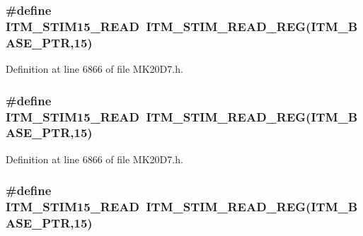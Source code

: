 \subsubsection[{\texorpdfstring{I\+T\+M\+\_\+\+S\+T\+I\+M15\+\_\+\+R\+E\+AD}{ITM_STIM15_READ}}]{\setlength{\rightskip}{0pt plus 5cm}\#define I\+T\+M\+\_\+\+S\+T\+I\+M15\+\_\+\+R\+E\+AD~{\bf I\+T\+M\+\_\+\+S\+T\+I\+M\+\_\+\+R\+E\+A\+D\+\_\+\+R\+EG}({\bf I\+T\+M\+\_\+\+B\+A\+S\+E\+\_\+\+P\+TR},15)}\hypertarget{group___i_t_m___register___accessor___macros_ga3ea562a68b32ba37c430e0b6d2507075}{}\label{group___i_t_m___register___accessor___macros_ga3ea562a68b32ba37c430e0b6d2507075}


Definition at line 6866 of file M\+K20\+D7.\+h.

\subsubsection[{\texorpdfstring{I\+T\+M\+\_\+\+S\+T\+I\+M15\+\_\+\+R\+E\+AD}{ITM_STIM15_READ}}]{\setlength{\rightskip}{0pt plus 5cm}\#define I\+T\+M\+\_\+\+S\+T\+I\+M15\+\_\+\+R\+E\+AD~{\bf I\+T\+M\+\_\+\+S\+T\+I\+M\+\_\+\+R\+E\+A\+D\+\_\+\+R\+EG}({\bf I\+T\+M\+\_\+\+B\+A\+S\+E\+\_\+\+P\+TR},15)}\hypertarget{group___i_t_m___register___accessor___macros_ga3ea562a68b32ba37c430e0b6d2507075}{}\label{group___i_t_m___register___accessor___macros_ga3ea562a68b32ba37c430e0b6d2507075}


Definition at line 6866 of file M\+K20\+D7.\+h.

\subsubsection[{\texorpdfstring{I\+T\+M\+\_\+\+S\+T\+I\+M15\+\_\+\+R\+E\+AD}{ITM_STIM15_READ}}]{\setlength{\rightskip}{0pt plus 5cm}\#define I\+T\+M\+\_\+\+S\+T\+I\+M15\+\_\+\+R\+E\+AD~{\bf I\+T\+M\+\_\+\+S\+T\+I\+M\+\_\+\+R\+E\+A\+D\+\_\+\+R\+EG}({\bf I\+T\+M\+\_\+\+B\+A\+S\+E\+\_\+\+P\+TR},15)}\hypertarget{group___i_t_m___register___accessor___macros_ga3ea562a68b32ba37c430e0b6d2507075}{}\label{group___i_t_m___register___accessor___macros_ga3ea562a68b32ba37c430e0b6d2507075}


